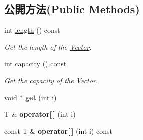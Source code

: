 \subsection*{公開方法(Public Methods)}
\begin{DoxyCompactItemize}
\item 
int \hyperlink{class_magnum_1_1_vector_a0350766ba61f29a27692e9a7f3e2e61d}{length} () const 
\begin{DoxyCompactList}\small\item\em Get the length of the \hyperlink{class_magnum_1_1_vector}{Vector}. \end{DoxyCompactList}\item 
int \hyperlink{class_magnum_1_1_vector_a8831d0ce69f8693ee20d8bcac32f198b}{capacity} () const 
\begin{DoxyCompactList}\small\item\em Get the capacity of the \hyperlink{class_magnum_1_1_vector}{Vector}. \end{DoxyCompactList}\item 
void $\ast$ {\bfseries get} (int i)\hypertarget{class_magnum_1_1_vector_a1e7f4e2774e1d3c4bbafdee1272acb79}{}\label{class_magnum_1_1_vector_a1e7f4e2774e1d3c4bbafdee1272acb79}

\item 
T \& {\bfseries operator\mbox{[}$\,$\mbox{]}} (int i)\hypertarget{class_magnum_1_1_vector_a0130a7137209ce2e30dbc52d9c2a938a}{}\label{class_magnum_1_1_vector_a0130a7137209ce2e30dbc52d9c2a938a}

\item 
const T \& {\bfseries operator\mbox{[}$\,$\mbox{]}} (int i) const \hypertarget{class_magnum_1_1_vector_acdc74b0e4facc66319461c7c079f455f}{}\label{class_magnum_1_1_vector_acdc74b0e4facc66319461c7c079f455f}


\end{DoxyCompactItemize}
